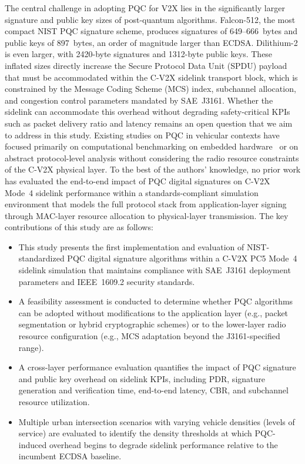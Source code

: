 \documentclass[letterpaper,journal]{IEEEtran}
\begin{document}
The central challenge in adopting PQC for V2X lies in the significantly larger signature and public key sizes of post-quantum algorithms. Falcon-512, the most compact NIST PQC signature scheme, produces signatures of 649--666~bytes and public keys of 897~bytes, an order of magnitude larger than ECDSA. Dilithium-2 is even larger, with 2420-byte signatures and 1312-byte public keys. These inflated sizes directly increase the Secure Protocol Data Unit (SPDU) payload that must be accommodated within the C-V2X sidelink transport block, which is constrained by the Message Coding Scheme (MCS) index, subchannel allocation, and congestion control parameters mandated by SAE~J3161. Whether the sidelink can accommodate this overhead without degrading safety-critical KPIs such as packet delivery ratio and latency remains an open question that we aim to address in this study.
\IEEEpubidadjcol
Existing studies on PQC in vehicular contexts have focused primarily on computational benchmarking on embedded hardware~\cite{kumar2024pqc_automotive} or on abstract protocol-level analysis without considering the radio resource constraints of the C-V2X physical layer. To the best of the authors' knowledge, no prior work has evaluated the end-to-end impact of PQC digital signatures on C-V2X Mode~4 sidelink performance within a standards-compliant simulation environment that models the full protocol stack from application-layer signing through MAC-layer resource allocation to physical-layer transmission. The key contributions of this study are as follows:
\begin{itemize}
    \item This study presents the first implementation and evaluation of NIST-standardized PQC digital signature algorithms within a C-V2X PC5 Mode~4 sidelink simulation that maintains compliance with SAE~J3161 deployment parameters and IEEE~1609.2 security standards.
    \item A feasibility assessment is conducted to determine whether PQC algorithms can be adopted without modifications to the application layer (e.g., packet segmentation or hybrid cryptographic schemes) or to the lower-layer radio resource configuration (e.g., MCS adaptation beyond the J3161-specified range).
    \item A cross-layer performance evaluation quantifies the impact of PQC signature and public key overhead on sidelink KPIs, including PDR, signature generation and verification time, end-to-end latency, CBR, and subchannel resource utilization.
    \item Multiple urban intersection scenarios with varying vehicle densities (levels of service) are evaluated to identify the density thresholds at which PQC-induced overhead begins to degrade sidelink performance relative to the incumbent ECDSA baseline.
\end{itemize}
\end{document}
